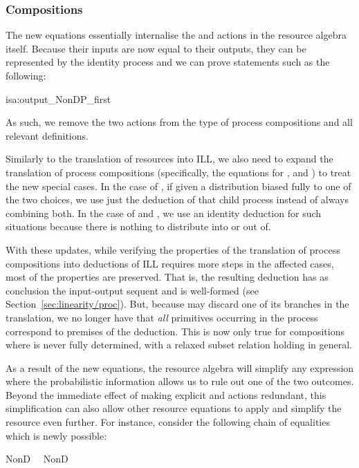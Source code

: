 \documentclass[class=smolathesis,crop=false]{standalone}
\begin{document}
\subsubsection{Compositions}
\label{sec:prob/simple-opt/inject-eqs/proc}

The new equations essentially internalise the  and  actions in the resource algebra itself.
Because their inputs are now equal to their outputs, they can be represented by the identity process and we can prove statements such as the following:
\pagebreak
\begin{isalemma}[]{isa:output_NonDP_first}
  
\end{isalemma}

As such, we remove the two actions from the type of process compositions and all relevant definitions.

Similarly to the translation of resources into ILL, we also need to expand the translation of process compositions (specifically, the equations for ,  and ) to treat the new special cases.
In the case of , if given a distribution biased fully to one of the two choices, we use just the deduction of that child process instead of always combining both.
In the case of  and , we use an identity deduction for such situations because there is nothing to distribute into or out of.

With these updates, while verifying the properties of the translation of process compositions into deductions of ILL requires more steps in the affected cases, most of the properties are preserved.
That is, the resulting deduction has as conclusion the input-output sequent and is well-formed (see Section~\ref{sec:linearity/proc}).
But, because  may discard one of its branches in the translation, we no longer have that \emph{all} primitives occurring in the process correspond to premises of the deduction.
This is now only true for compositions where  is never fully determined, with a relaxed subset relation holding in general.

As a result of the new equations, the resource algebra will simplify any expression where the probabilistic information allows us to rule out one of the two outcomes.
Beyond the immediate effect of making explicit  and  actions redundant, this simplification can also allow other resource equations to apply and simplify the resource even further.
For instance, consider the following chain of equalities which is newly possible:
\begin{isabelle}
\centering
  NonD\ \ \isanewline
  \isanewline
  \isacharequal{\quad}NonD\ \isanewline
  \isacharequal{\quad}
\end{isabelle}
\end{document}
